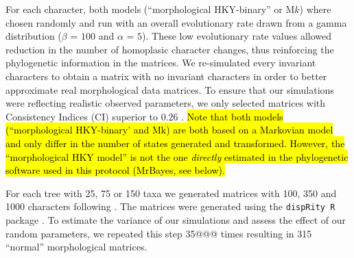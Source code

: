 \documentclass[12pt,letterpaper]{article}
\begin{document}
\noindent For each character, both models (``morphological HKY-binary'' or M$k$) where chosen randomly and run with an overall evolutionary rate drawn from a gamma distribution ($\beta$ = $100$ and $\alpha$ = $5$).
These low evolutionary rate values allowed reduction in the number of homoplasic character changes, thus reinforcing the phylogenetic information in the matrices.
We re-simulated every invariant characters to obtain a matrix with no invariant characters in order to better approximate real morphological data matrices.
To ensure that our simulations were reflecting realistic observed parameters, we only selected matrices with Consistency Indices (CI) superior to $0.26$ \citep{sanderson1989patterns,OReilly20160081}.
\hl{Note that both models (``morphological HKY-binary' and Mk) are both based on a Markovian model and only differ in the number of states generated and transformed.
However, the ``morphological HKY model'' is not the one \textit{directly} estimated in the phylogenetic software used in this protocol (MrBayes, see below).}

For each tree with 25, 75 or 150 taxa we generated matrices with 100, 350 and 1000 characters following \cite{OReilly20160081}.
The matrices were generated using the \texttt{dispRity R} package \citep{thomas_guillerme_2016_55646}.
To estimate the variance of our simulations and assess the effect of our random parameters, we repeated this step 35@@@ times resulting in 315 ``normal'' morphological matrices.
\end{document}
